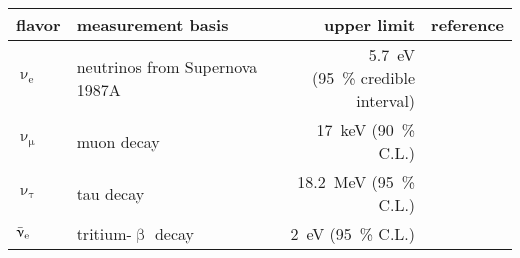 \begin{table}
	\centering
	\label{tab:neutrinoPhysicsAbsoluteNuMassMeasurementKinLimits}
		\begin{tabular}{llrr}
		\toprule
		flavor & measurement basis & upper limit & reference \\
		\hline
		$\upnu_\mathrm{e}$ &
		neutrinos from Supernova 1987A &
		\makecell[r]{\SI{5.7}{eV}\\(\SI{95}{\percent} credible interval)} &
		\cite{Loredo2002} \\
		$\upnu_\upmu$ &
		muon decay &
		\SI{17}{keV} (\SI{90}{\percent} C.L.) &
		\cite{Assamagan1996} \\
		$\upnu_\uptau$ &
		tau decay &
		\SI{18.2}{MeV} (\SI{95}{\percent} C.L.) &
		\cite{Barate:1997zg} \\
		$\bar{\upnu}_{\mathrm{e}}$ &
		tritium-$\upbeta$ decay &
		\SI{2}{eV} (\SI{95}{\percent} C.L.) &
		\cite{ReviewOfParticlePhysics} \\
		\bottomrule
	\end{tabular}
\end{table}


